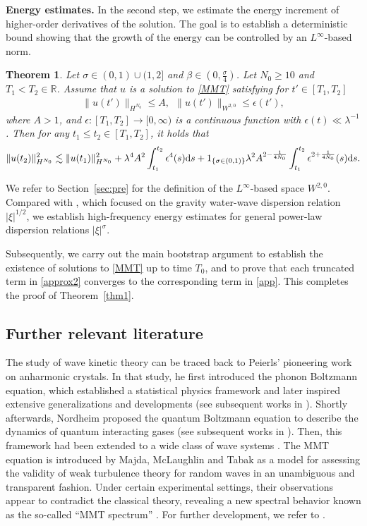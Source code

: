 \documentclass[UTF-8,reqno]{amsart}
\numberwithin{equation}{section}
\newtheorem{theorem}{Theorem}[section]
\theoremstyle{definition}
\def\dif{{\mathord{{\rm d}}}}
\def\geq{\geqslant}
\def\leq{\leqslant}
\def\dif{{\mathord{{\rm d}}}}
\def\geq{\geqslant}
\def\leq{\leqslant}
\begin{document}
\textbf{Energy estimates.} In the second step, we estimate the energy increment of higher-order derivatives of the solution. 
The goal is to establish a deterministic bound showing that the growth of the energy can be controlled by an $L^\infty$-based norm.
\begin{theorem}\label{thm:energy inequality}
    Let $\sigma\in(0,1)\cup (1,2]$ and $\beta\in(0,\frac{\sigma}{4})$. Let $N_0\geq10$ and $T_1<T_2\in\mathbb{R}$. Assume that $u$ is a solution to \eqref{MMT} satisfying for $t'\in[T_1,T_2]$ \begin{align}
   \|u(t')\|_{H^{N_0}}\leq A,\ \  \|u(t')\|_{ {W}^{2,0}}\leq \epsilon(t'),\label{bd:thm9.1}
\end{align}
where $A>1$, and $\epsilon:[T_1,T_2]\to[0,\infty)$ is a continuous function with $\epsilon(t)\ll \lambda^{-1}$.
Then   for any $t_1\leq t_2\in[T_1,T_2]$, it holds that
\begin{align*}
 \|u(t_2)\|_{H^{N_0}}^2\lesssim  \|u(t_1)\|_{H^{N_0}}^2 +\lambda^4A^2\int_{t_1}^{t_2}\epsilon^4(s)\dif s+1_{\{\sigma\in(0,1)\}}\lambda^2A^{2-\frac{1}{4N_0}}\int_{t_1}^{t_2}\epsilon^{2+\frac{1}{4N_0}}(s)\dif s.%
\end{align*}
\end{theorem}
We refer to Section~\ref{sec:pre} for the definition of the $L^\infty$-based space $W^{2,0}$. Compared with \cite{DIP25a}, which focused on the gravity
water-wave dispersion relation $|\xi|^{1/2}$, we establish high-frequency
energy estimates for general power-law dispersion relations
$|\xi|^\sigma$.

Subsequently, we carry out the main bootstrap argument to establish the existence of solutions to \eqref{MMT} up to time $T_0$, and to prove that each truncated term in \eqref{approx2} converges to the corresponding term in \eqref{app}. This completes the proof of Theorem~\ref{thm1}.

\subsection{Further relevant literature}\label{sec:liter}
The study of wave kinetic theory can be traced back to Peierls’ pioneering work \cite{Pei29} on anharmonic crystals. In that study, he first introduced  the phonon Boltzmann equation, which established a statistical physics framework and later inspired extensive generalizations and developments (see subsequent works in \cite{Spo06,Spo08}). Shortly afterwards, Nordheim \cite{Nor28} proposed the quantum Boltzmann equation to describe the dynamics of quantum interacting gases (see subsequent works in \cite{UU33,Hug83,ESY03}). Then, this framework had been extended to a wide class of wave systems \cite{Dav72,ZS67,Has62,BN69}. The MMT equation is introduced by Majda, McLaughlin and Tabak \cite{MMT97}  as a model for assessing the validity of weak turbulence theory for random waves 
in an unambiguous and transparent fashion.  Under certain experimental settings, their observations appear to contradict the classical theory, revealing a new spectral behavior known as the so-called “MMT spectrum” \cite{CMMT99,CMMT01}.  For further development, we refer to \cite{ZDP04,ZGPD01, DB23}.
\end{document}
